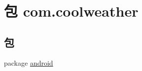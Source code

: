 \hypertarget{namespacecom_1_1coolweather}{}\section{包 com.\+coolweather}
\label{namespacecom_1_1coolweather}
\subsection*{包}
\begin{DoxyCompactItemize}
\item 
package \mbox{\hyperlink{namespacecom_1_1coolweather_1_1android}{android}}
\end{DoxyCompactItemize}
